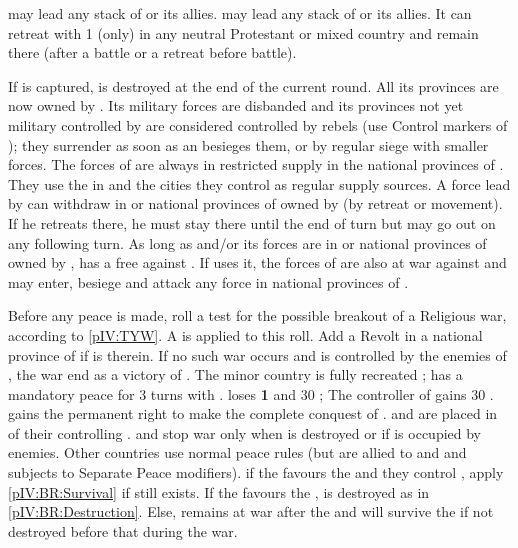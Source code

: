 \phmil
\aparag \leaderTilly may lead any stack of \paysBaviere or its allies.
\aparag \leaderMansfeld may lead any stack of \paysPalatinat or its allies. It
can retreat with 1 \LD (only) in any neutral Protestant or mixed \HRE country
and remain there (after a battle or a retreat before battle).

\label{pIV:BR:Destruction}
If \villePrague is captured, \paysBoheme is destroyed at the end of the
current round. All its provinces are now owned by \HAB.  Its military forces
are disbanded and its provinces not yet military controlled by \HAB are
considered controlled by rebels (use Control markers of \paysBoheme); they
surrender as soon as an \ARMY \faceplus besieges them, or by regular siege
with smaller forces.
\aparag[Bethlén]
\bparag The forces of \leaderBethlen are always in restricted supply in the
national provinces of \paysHongrie. They use the \REVOLT in \paysHongrie and
the cities they control as regular supply sources.
\bparag A force lead by \leaderBethlen can withdraw in \paysTransylvanie or
national provinces of \payshongrie owned by \TUR (by retreat or movement). If
he retreats there, he must stay there until the end of turn but may go out on
any following turn.
\bparag As long as \leaderBethlen and/or its forces are in \paysTransylvanie
or national provinces of \payshongrie owned by \TUR, \TUR has a free \CB
against \leaderBethlen. If \TUR uses it, the forces of \leaderBethlen are also
at war against \TUR and \TUR may enter, besiege and attack any force in
national provinces of \payshongrie.

\phpaix
\aparag Before any peace is made, roll a test for the possible breakout of a
Religious war, according to \ref{pIV:TYW}.  A  is applied to this
roll.
\aparag Add a Revolt \facemoins in a national province of \payshongrie if
\leaderBethlen is therein.
\label{pIV:BR:Survival} If no such war occurs
and \villeVienne is controlled by the enemies of \HAB, the war end as a
victory of \paysBoheme.  The minor country is fully recreated ; \HAB has a
mandatory peace for 3 turns with \paysBoheme. \HAB loses {\bf 1} \STAB and 30
\PV ; The controller of \paysBoheme gains 30 \PV. \HAB gains the permanent
right to make the complete conquest of \paysBoheme.  \paysBoheme and
\paysPalatinat are placed in \AM of their controlling \MAJ.
\aparag \HAB and \paysBoheme stop war only when \paysBoheme is destroyed or if
\villeVienne is occupied by enemies.  Other countries use normal peace rules
(but are allied to \HAB and \paysBoheme and subjects to Separate Peace
modifiers).
\bparag if the  favours the \alliance and they
control \villeVienne, apply \ref{pIV:BR:Survival} if \paysBoheme still exists.
\bparag If the  favours the \ligue, \paysBoheme
is destroyed as in \ref{pIV:BR:Destruction}.
\bparag Else, \paysBoheme remains at war after the  and will survive the  if not
destroyed before that during the war.

